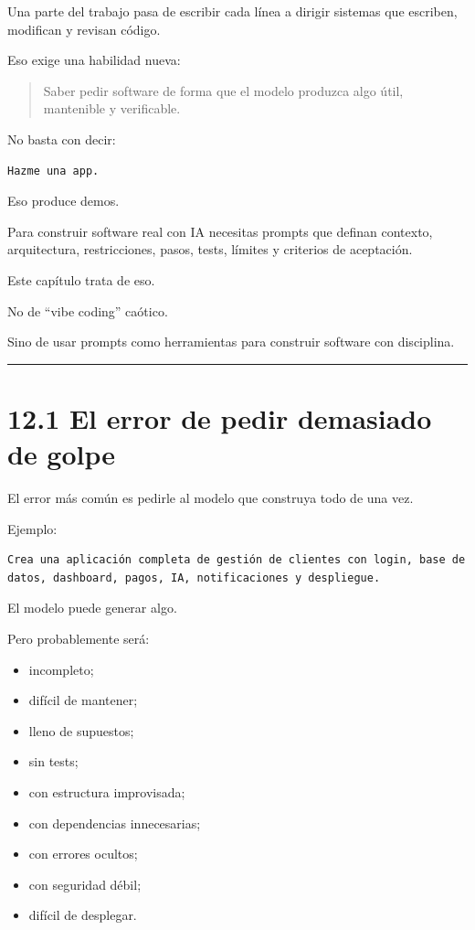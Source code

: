 Una parte del trabajo pasa de escribir cada línea a dirigir sistemas que
escriben, modifican y revisan código.

Eso exige una habilidad nueva:

\begin{quote}
Saber pedir software de forma que el modelo produzca algo útil,
mantenible y verificable.
\end{quote}

No basta con decir:

\begin{lstlisting}
Hazme una app.
\end{lstlisting}

Eso produce demos.

Para construir software real con IA necesitas prompts que definan
contexto, arquitectura, restricciones, pasos, tests, límites y criterios
de aceptación.

Este capítulo trata de eso.

No de ``vibe coding'' caótico.

Sino de usar prompts como herramientas para construir software con
disciplina.

\begin{center}\rule{0.5\linewidth}{0.5pt}\end{center}

\section{12.1 El error de pedir demasiado de
golpe}\label{el-error-de-pedir-demasiado-de-golpe}

El error más común es pedirle al modelo que construya todo de una vez.

Ejemplo:

\begin{lstlisting}
Crea una aplicación completa de gestión de clientes con login, base de datos, dashboard, pagos, IA, notificaciones y despliegue.
\end{lstlisting}

El modelo puede generar algo.

Pero probablemente será:

\begin{itemize}
\tightlist
\item
  incompleto;
\item
  difícil de mantener;
\item
  lleno de supuestos;
\item
  sin tests;
\item
  con estructura improvisada;
\item
  con dependencias innecesarias;
\item
  con errores ocultos;
\item
  con seguridad débil;
\item
  difícil de desplegar.
\end{itemize}

